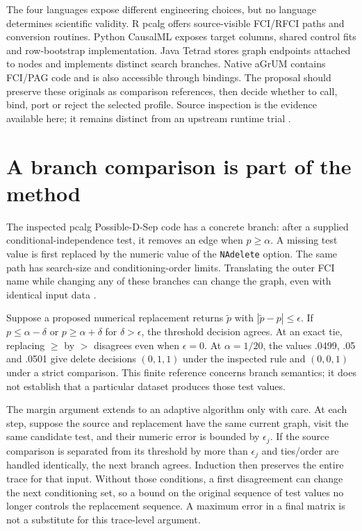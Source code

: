 The four languages expose different engineering choices, but no language
determines scientific validity. R pcalg offers source-visible FCI/RFCI paths
and conversion routines. Python CausalML exposes target columns, shared control
fits and row-bootstrap implementation. Java Tetrad stores graph endpoints
attached to nodes and implements distinct search branches. Native aGrUM
contains FCI/PAG code and is also accessible through bindings. The proposal
should preserve these originals as comparison references, then decide whether
to call, bind, port or reject the selected profile. Source inspection is the
evidence available here; it remains distinct from an upstream runtime trial
\citep{exec13_latentr_primary,exec14_causalml_primary,
exec14_java_latent_sources,exec14_native_agrum}.

\section{A branch comparison is part of the method}

The inspected pcalg Possible-D-Sep code has a concrete branch: after a supplied
conditional-independence test, it removes an edge when $p\geq\alpha$. A
missing test value is first replaced by the numeric value of the
\texttt{NAdelete} option. The same path has search-size and conditioning-order
limits. Translating the outer FCI name while changing any of these branches
can change the graph, even with identical input data
\citep{exec13_latentr_primary}.

Suppose a proposed numerical replacement returns $\widetilde p$ with
$|\widetilde p-p|\leq\epsilon$. If $p\leq\alpha-\delta$ or
$p\geq\alpha+\delta$ for $\delta>\epsilon$, the threshold decision agrees.
At an exact tie, replacing $\geq$ by $>$ disagrees even when $\epsilon=0$.
At $\alpha=1/20$, the values .0499, .05 and .0501 give delete decisions
$(0,1,1)$ under the inspected rule and $(0,0,1)$ under a strict comparison.
This finite reference concerns branch semantics; it does not establish that a
particular dataset produces those test values.

The margin argument extends to an adaptive algorithm only with care. At each
step, suppose the source and replacement have the same current graph, visit
the same candidate test, and their numeric error is bounded by $\epsilon_j$.
If the source comparison is separated from its threshold by more than
$\epsilon_j$ and ties/order are handled identically, the next branch agrees.
Induction then preserves the entire trace for that input. Without those
conditions, a first disagreement can change the next conditioning set, so a
bound on the original sequence of test values no longer controls the replacement
sequence. A maximum error in a final matrix is not a substitute for this
trace-level argument.

